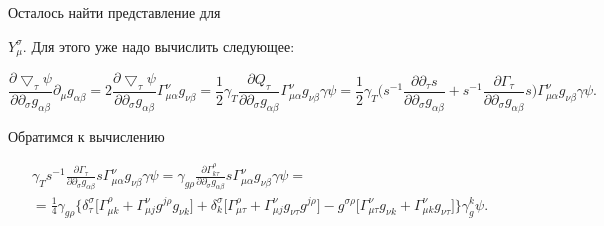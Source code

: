 Осталось найти представление для


$Y^\sigma_\mu$. Для этого уже надо вычислить следующее:


$$


\frac{\partial\bigtriangledown_\tau\psi}


{\partial\partial_\sigma g_{\alpha\beta}}\partial_\mu


g_{\alpha\beta}=2\frac{\partial\bigtriangledown_\tau\psi}


{\partial\partial_\sigma g_{\alpha\beta}}\Gamma^\nu_{\mu\alpha}


g_{\nu\beta}=\frac{1}{2}\gamma_T\frac{\partial Q_\tau}


{\partial\partial_\sigma g_{\alpha\beta}}\Gamma^\nu_{\mu\alpha}


g_{\nu\beta}\gamma\psi=


\frac{1}{2}\gamma_T\bigg(s^{-1}\frac{\partial\partial _\tau s}


{\partial\partial_\sigma g_{\alpha\beta}}+


s^{-1}\frac{\partial


\Gamma_\tau}{\partial\partial_\sigma g_{\alpha\beta}}


s\bigg)\Gamma^\nu_{\mu\alpha} g_{\nu\beta}\gamma\psi.


$$


Обратимся к вычислению


\begin{gather*}


\gamma_Ts^{-1}\frac{\partial


\Gamma_\tau}{\partial\partial_\sigma g_{\alpha\beta}}


s\Gamma^\nu_{\mu\alpha} g_{\nu\beta}\gamma\psi=


\gamma_{g\rho}\frac{\partial


\Gamma^\rho_{k\tau}}{\partial\partial_\sigma g_{\alpha\beta}}


s\Gamma^\nu_{\mu\alpha} g_{\nu\beta}\gamma\psi= \\


%


=\frac{1}{4}\gamma_{g\rho}\big\{\delta^\sigma_\tau\big[


\Gamma^\rho_{\mu k}+\Gamma^\nu_{\mu j}g^{j\rho}g_{\nu k}\big]+


\delta^\sigma_k\big[\Gamma^\rho_{\mu \tau}+\Gamma^\nu_{\mu j}


g_{\nu\tau}g^{j\rho}\big]-


g^{\sigma\rho}\big[\Gamma^\nu_{\mu \tau}g_{\nu k}+


\Gamma^\nu_{\mu k}g_{\nu\tau}\big]\big\}\gamma^k_g\psi.


\end{gather*}



